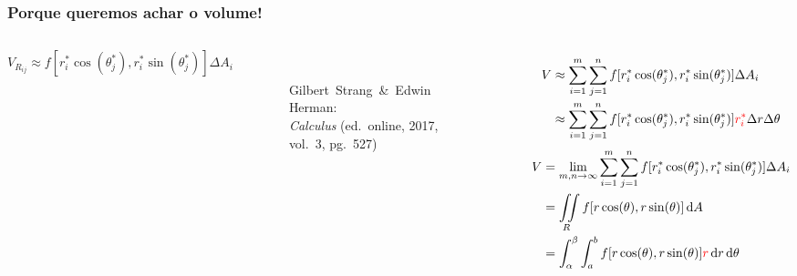 \documentclass[pdftex, brazil, aspectratio=169]{beamer}
\newcommand*\diff{\mathop{}\!\mathrm{d}}
\begin{document}
\begin{frame}
  \frametitle{Porque queremos achar o volume!}
  \begin{columns}
    \centering
    \begin{equation*}
      V_{R_{ij}} \approx f[r_i^* \cos(\theta_j^*), r_i^* \sin(\theta_j^*)] \Delta A_i
    \end{equation*}
    \vspace{-1.45cm}
  \begin{figure}[H]
    \begin{center}
      \label{fig:int2-31}
      \\
      \footnotesize{Gilbert~Strang~\&~Edwin~ Herman:\\ \emph{Calculus}
          (ed.\ online, 2017, vol.\ 3, pg.\ 527)}
    \end{center}
  \end{figure}
    \centering
    \begin{equation}
      \begin{split}
        V &\approx \sum_{i=1}^m \sum_{j=1}^n f[r_i^* \cos(\theta_j^*),
        r_i^* \sin(\theta_j^*)] \Delta A_i\\
          &\approx \sum_{i=1}^m \sum_{j=1}^n f[r_i^* \cos(\theta_j^*),
        r_i^* \sin(\theta_j^*)] \color{red}r_i^*\color{black}\Delta r
        \Delta \theta
      \end{split}
    \end{equation}
    \begin{equation}
      \begin{split}
        V &= \lim_{m,n \to \infty} \sum_{i=1}^m \sum_{j=1}^n f[r_i^* \cos(\theta_j^*),
          r_i^* \sin(\theta_j^*)] \Delta A_i\\
          &= \iint\displaylimits_R f[r \cos(\theta), r \sin(\theta)]
        \diff A\\
          &= \int_\alpha^\beta \int_a^b f[r \cos(\theta), r
          \sin(\theta)] \color{red}r\color{black} \diff r \diff \theta
      \end{split}
    \end{equation}
  \end{columns}
\end{frame}
\end{document}
